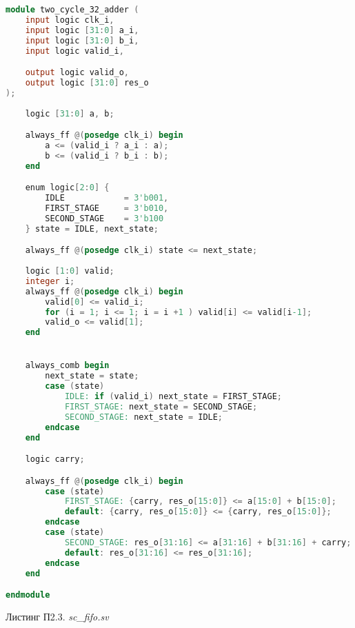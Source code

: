 \begin{lstlisting}[language=Verilog]
module two_cycle_32_adder (
    input logic clk_i,
    input logic [31:0] a_i,
    input logic [31:0] b_i,
    input logic valid_i,

    output logic valid_o,
    output logic [31:0] res_o
);
    
    logic [31:0] a, b;

    always_ff @(posedge clk_i) begin
        a <= (valid_i ? a_i : a);
        b <= (valid_i ? b_i : b);
    end

    enum logic[2:0] {
        IDLE            = 3'b001, 
        FIRST_STAGE     = 3'b010, 
        SECOND_STAGE    = 3'b100
    } state = IDLE, next_state;

    always_ff @(posedge clk_i) state <= next_state;
  
    logic [1:0] valid;
    integer i;
    always_ff @(posedge clk_i) begin
        valid[0] <= valid_i;
        for (i = 1; i <= 1; i = i +1 ) valid[i] <= valid[i-1];
        valid_o <= valid[1];
    end


    always_comb begin
        next_state = state;
        case (state)
            IDLE: if (valid_i) next_state = FIRST_STAGE;
            FIRST_STAGE: next_state = SECOND_STAGE;
            SECOND_STAGE: next_state = IDLE;
        endcase
    end

    logic carry;

    always_ff @(posedge clk_i) begin
        case (state) 
            FIRST_STAGE: {carry, res_o[15:0]} <= a[15:0] + b[15:0];
            default: {carry, res_o[15:0]} <= {carry, res_o[15:0]};
        endcase
        case (state)
            SECOND_STAGE: res_o[31:16] <= a[31:16] + b[31:16] + carry;
            default: res_o[31:16] <= res_o[31:16];
        endcase
    end

endmodule
\end{lstlisting}

\begin{flushright}
Листинг П2.3. \emph{sc\_fifo.sv}
\end{flushright}

